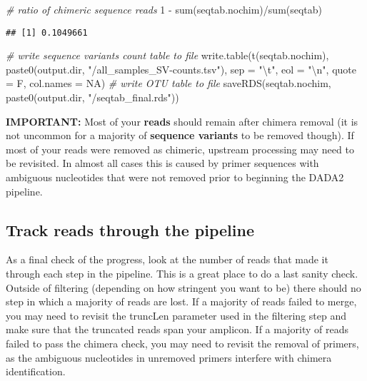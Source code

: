 \documentclass[
]{article}
\newenvironment{Shaded}{\begin{snugshade}}{\end{snugshade}}
\newcommand{\AttributeTok}[1]{\textcolor[rgb]{0.77,0.63,0.00}{#1}}
\newcommand{\CommentTok}[1]{\textcolor[rgb]{0.56,0.35,0.01}{\textit{#1}}}
\newcommand{\ConstantTok}[1]{\textcolor[rgb]{0.00,0.00,0.00}{#1}}
\newcommand{\DecValTok}[1]{\textcolor[rgb]{0.00,0.00,0.81}{#1}}
\newcommand{\FunctionTok}[1]{\textcolor[rgb]{0.00,0.00,0.00}{#1}}
\newcommand{\NormalTok}[1]{#1}
\newcommand{\SpecialCharTok}[1]{\textcolor[rgb]{0.00,0.00,0.00}{#1}}
\newcommand{\StringTok}[1]{\textcolor[rgb]{0.31,0.60,0.02}{#1}}
\begin{document}
\begin{Shaded}
\begin{Highlighting}[]
\CommentTok{\# ratio of chimeric sequence reads}
\DecValTok{1} \SpecialCharTok{{-}} \FunctionTok{sum}\NormalTok{(seqtab.nochim)}\SpecialCharTok{/}\FunctionTok{sum}\NormalTok{(seqtab)}
\end{Highlighting}
\end{Shaded}

\begin{verbatim}
## [1] 0.1049661
\end{verbatim}

\begin{Shaded}
\begin{Highlighting}[]
\CommentTok{\# write sequence variants count table to file}
\FunctionTok{write.table}\NormalTok{(}\FunctionTok{t}\NormalTok{(seqtab.nochim), }\FunctionTok{paste0}\NormalTok{(output.dir, }\StringTok{"/all\_samples\_SV{-}counts.tsv"}\NormalTok{), }
    \AttributeTok{sep =} \StringTok{"}\SpecialCharTok{\textbackslash{}t}\StringTok{"}\NormalTok{, }\AttributeTok{eol =} \StringTok{"}\SpecialCharTok{\textbackslash{}n}\StringTok{"}\NormalTok{, }\AttributeTok{quote =}\NormalTok{ F, }\AttributeTok{col.names =} \ConstantTok{NA}\NormalTok{)}
\CommentTok{\# write OTU table to file}
\FunctionTok{saveRDS}\NormalTok{(seqtab.nochim, }\FunctionTok{paste0}\NormalTok{(output.dir, }\StringTok{"/seqtab\_final.rds"}\NormalTok{))}
\end{Highlighting}
\end{Shaded}

\textbf{IMPORTANT:} Most of your \textbf{reads} should remain after
chimera removal (it is not uncommon for a majority of \textbf{sequence
variants} to be removed though). If most of your reads were removed as
chimeric, upstream processing may need to be revisited. In almost all
cases this is caused by primer sequences with ambiguous nucleotides that
were not removed prior to beginning the DADA2 pipeline.

\hypertarget{track-reads-through-the-pipeline}{%
\subsection{Track reads through the
pipeline}\label{track-reads-through-the-pipeline}}

As a final check of the progress, look at the number of reads that made
it through each step in the pipeline. This is a great place to do a last
sanity check. Outside of filtering (depending on how stringent you want
to be) there should no step in which a majority of reads are lost. If a
majority of reads failed to merge, you may need to revisit the truncLen
parameter used in the filtering step and make sure that the truncated
reads span your amplicon. If a majority of reads failed to pass the
chimera check, you may need to revisit the removal of primers, as the
ambiguous nucleotides in unremoved primers interfere with chimera
identification.
\end{document}
